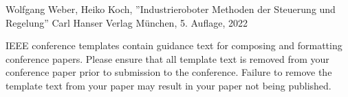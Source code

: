 \documentclass[conference]{IEEEtran}
\begin{document}





\begin{thebibliography}{00}
     Wolfgang Weber, Heiko Koch, ''Industrieroboter Methoden der Steuerung und Regelung'' Carl Hanser Verlag München, 5. Auflage, 2022

\end{thebibliography} 
\vspace{12pt}
\color{red}
IEEE conference templates contain guidance text for composing and formatting conference papers. Please ensure that all template text is removed from your conference paper prior to submission to the conference. Failure to remove the template text from your paper may result in your paper not being published.
\end{document}
